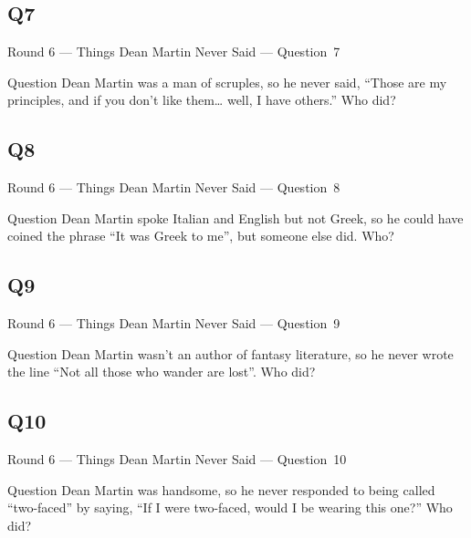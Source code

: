 \documentclass[11pt]{beamer}
\begin{document}
\subsection*{Q7}
\begin{frame}[t]{Round 6 --- Things Dean Martin Never Said --- \mbox{Question 7}}
\vspace{-0.5em}
\begin{block}{Question}
Dean Martin was a man of scruples, so he never said, ``Those are my principles, and if you don't like them\ldots{} well, I have others.'' Who did?
\end{block}
\end{frame}
\subsection*{Q8}
\begin{frame}[t]{Round 6 --- Things Dean Martin Never Said --- \mbox{Question 8}}
\vspace{-0.5em}
\begin{block}{Question}
Dean Martin spoke Italian and English but not Greek, so he could have coined the phrase ``It was Greek to me'', but someone else did. Who?
\end{block}
\end{frame}
\subsection*{Q9}
\begin{frame}[t]{Round 6 --- Things Dean Martin Never Said --- \mbox{Question 9}}
\vspace{-0.5em}
\begin{block}{Question}
Dean Martin wasn't an author of fantasy literature, so he never wrote the line ``Not all those who wander are lost''. Who did?
\end{block}
\end{frame}
\subsection*{Q10}
\begin{frame}[t]{Round 6 --- Things Dean Martin Never Said --- \mbox{Question 10}}
\vspace{-0.5em}
\begin{block}{Question}
Dean Martin was handsome, so he never responded to being called ``two-faced'' by saying, ``If I were two-faced, would I be wearing this one?'' Who did?
\end{block}
\end{frame}
\end{document}
